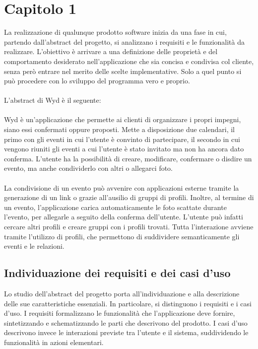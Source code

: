 \chapter{Capitolo 1}

La realizzazione di qualunque prodotto software inizia da una fase in cui,
partendo dall’abstract del progetto, si analizzano i requisiti e le funzionalità da realizzare.
L’obiettivo è arrivare a una definizione delle proprietà e
del comportamento desiderato nell’applicazione che sia concisa e condivisa col cliente,
senza però entrare nel merito delle scelte implementative.
Solo a quel punto si può procedere con lo sviluppo del programma vero e proprio.\\
\\
L'abstract di Wyd è il seguente:\\
\\
Wyd è un'applicazione che permette ai clienti di organizzare i propri impegni,
siano essi confermati oppure proposti.
Mette a disposizione due calendari,
il primo con gli eventi in cui l'utente è convinto di partecipare,
il secondo in cui vengono riuniti gli eventi a cui l'utente è stato invitato ma non ha ancora dato conferma.
L'utente ha la possibilità di creare, modificare, confermare o disdire un evento,
ma anche condividerlo con altri o allegarci foto.\\
\\
La condivisione di un evento può avvenire con applicazioni esterne tramite la generazione di un link o
grazie all'ausilio di gruppi di profili.
Inoltre, al termine di un evento, l'applicazione carica automaticamente le foto scattate
durante l'evento, per allegarle a seguito della conferma dell'utente.
L'utente può infatti cercare altri profili e creare gruppi con i profili trovati.
Tutta l'interazione avviene tramite l'utilizzo di profili,
che permettono di suddividere semanticamente gli eventi e le relazioni.
\clearpage

\section{Individuazione dei requisiti e dei casi d’uso}

Lo studio dell’abstract del progetto porta all’individuazione e
alla descrizione delle sue caratteristiche essenziali.
In particolare, si distinguono i requisiti e i casi d'uso.
I requisiti formalizzano le funzionalità che l'applicazione deve fornire,
sintetizzando e schematizzando le parti che descrivono del prodotto.
I casi d'uso descrivono invece le interazioni previste tra l'utente e il sistema,
suddividendo le funzionalità in azioni elementari.
